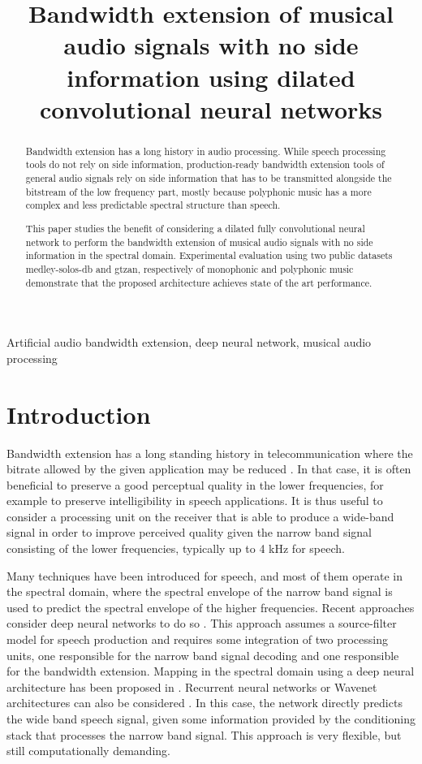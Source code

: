 \documentclass{article}
\title{Bandwidth extension of musical audio signals with no side information using dilated convolutional neural networks}
\begin{document}
%
\maketitle
%
\begin{abstract}

Bandwidth extension has a long history in audio processing. While speech processing tools do not rely on side information, production-ready bandwidth extension tools of general audio signals rely on side information that has to be transmitted alongside the bitstream of the low frequency part, mostly because polyphonic music has a more complex and less predictable spectral structure than speech.

This paper studies the benefit of considering a dilated fully convolutional neural network to perform the bandwidth extension of musical audio signals with no side information in the spectral domain. Experimental evaluation using two public datasets medley-solos-db and gtzan, respectively of monophonic and polyphonic music demonstrate that the proposed architecture achieves state of the art performance.

\end{abstract}
%
\begin{keywords}
Artificial audio bandwidth extension, deep neural network, musical audio processing
\end{keywords}
%
\section{Introduction}
\label{sec:intro}

Bandwidth extension has a long standing history in telecommunication where the bitrate allowed by the given application may be reduced \cite{larsen2005audio}. In that case, it is often beneficial to preserve a good perceptual quality in the lower frequencies, for example to preserve intelligibility in speech applications. It is thus useful to consider a processing unit on the receiver that is able to produce a wide-band signal in order to improve perceived quality given the narrow band signal consisting of the lower frequencies, typically up to 4 kHz for speech.

Many techniques have been introduced for speech, and most of them operate in the spectral domain, where the spectral envelope of the narrow band signal is used to predict the spectral envelope of the higher frequencies. Recent approaches consider deep neural networks to do so \cite{abel2017artificial}. This approach assumes a source-filter model for speech production and requires some integration of two processing units, one responsible for the narrow band signal decoding and one responsible for the bandwidth extension. Mapping in the spectral domain using a deep neural architecture has been proposed in \cite{li2015deep}. Recurrent neural networks \cite{ling2018waveform} or Wavenet architectures can also be considered \cite{gupta2019speech}. In this case, the network directly predicts the wide band speech signal, given some information provided by the conditioning stack that processes the narrow band signal. This approach is very flexible, but still computationally demanding.
\end{document}
